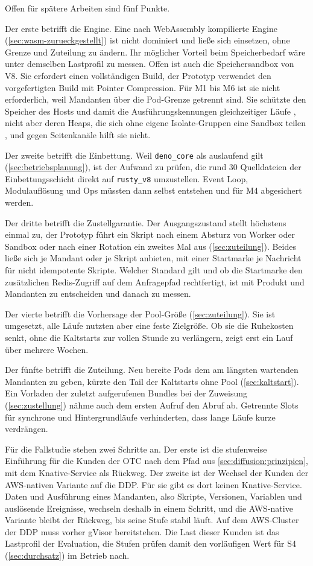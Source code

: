 Offen für spätere Arbeiten sind fünf Punkte.

Der erste betrifft die Engine. Eine nach WebAssembly kompilierte Engine (\autoref{sec:wasm-zurueckgestellt}) ist nicht
dominiert und ließe sich einsetzen, ohne Grenze und Zuteilung zu ändern. Ihr möglicher Vorteil beim Speicherbedarf wäre
unter demselben Lastprofil zu messen. Offen ist auch die Speichersandbox von V8. Sie erfordert einen vollständigen
Build, der Prototyp verwendet den vorgefertigten Build mit Pointer Compression. Für M1 bis M6 ist sie nicht
erforderlich, weil Mandanten über die Pod-Grenze getrennt sind. Sie schützte den Speicher des Hosts und damit die
Ausführungskennungen gleichzeitiger Läufe \autocite{gross_v8_2024}, nicht aber deren Heaps, die sich ohne eigene Isolate-Gruppen eine Sandbox
teilen \autocite{the_v8_authors_isolate_2026}, und gegen Seitenkanäle hilft sie nicht.

Der zweite betrifft die Einbettung. Weil \texttt{deno\_core} als auslaufend gilt (\autoref{sec:betriebsplanung}), ist der
Aufwand zu prüfen, die rund 30 Quelldateien der Einbettungsschicht direkt auf \texttt{rusty\_v8} umzustellen. Event
Loop, Modulauflösung und Ops müssten dann selbst entstehen und für M4 abgesichert werden.

Der dritte betrifft die Zustellgarantie. Der Ausgangszustand stellt höchstens einmal zu, der Prototyp führt ein
Skript nach einem Absturz von Worker oder Sandbox oder nach einer Rotation ein zweites Mal aus (\autoref{sec:zuteilung}). Beides ließe sich je Mandant
oder je Skript anbieten, mit einer Startmarke je Nachricht für nicht idempotente Skripte. Welcher Standard gilt und ob
die Startmarke den zusätzlichen Redis-Zugriff auf dem Anfragepfad rechtfertigt, ist mit Produkt und Mandanten zu
entscheiden und danach zu messen.

Der vierte betrifft die Vorhersage der Pool-Größe (\autoref{sec:zuteilung}). Sie ist umgesetzt, alle Läufe nutzten
aber eine feste Zielgröße. Ob sie die Ruhekosten senkt, ohne die Kaltstarts zur vollen Stunde zu verlängern,
zeigt erst ein Lauf über mehrere Wochen.

Der fünfte betrifft die Zuteilung. Neu bereite Pods dem am längsten wartenden Mandanten zu geben, kürzte den Tail der
Kaltstarts ohne Pool (\autoref{sec:kaltstart}). Ein Vorladen der zuletzt aufgerufenen Bundles bei der Zuweisung
(\autoref{sec:zustellung}) nähme auch dem ersten Aufruf den Abruf ab. Getrennte Slots für synchrone und
Hintergrundläufe verhinderten, dass lange Läufe kurze verdrängen.

Für die Fallstudie stehen zwei Schritte an. Der erste ist die stufenweise Einführung für die Kunden der \ac{OTC} nach dem
Pfad aus \autoref{sec:diffusion:prinzipien}, mit dem Knative-Service als Rückweg. Der zweite ist der Wechsel der Kunden
der \acs{AWS}-nativen Variante auf die \ac{DDP}. Für sie gibt es dort keinen Knative-Service. Daten und Ausführung eines
Mandanten, also Skripte, Versionen, Variablen und auslösende Ereignisse, wechseln deshalb in einem Schritt, und die
\acs{AWS}-native Variante bleibt der Rückweg, bis seine Stufe stabil läuft. Auf dem \acs{AWS}-Cluster der \ac{DDP} muss vorher gVisor
bereitstehen. Die Last dieser Kunden ist das Lastprofil der Evaluation, die Stufen prüfen damit
den vorläufigen Wert für S4 (\autoref{sec:durchsatz}) im Betrieb nach.
